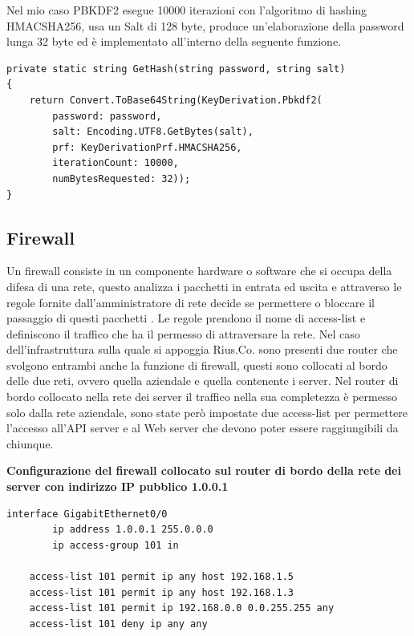 \medskip
Nel mio caso PBKDF2 esegue 10000 iterazioni con l'algoritmo di hashing HMACSHA256, usa un Salt di 128 byte, produce un'elaborazione della password lunga 32 byte ed è implementato all'interno della seguente funzione. 
\smallskip

\begin{lstlisting}[style=csharp]
private static string GetHash(string password, string salt)
{
    return Convert.ToBase64String(KeyDerivation.Pbkdf2(
        password: password,
        salt: Encoding.UTF8.GetBytes(salt),
        prf: KeyDerivationPrf.HMACSHA256,
        iterationCount: 10000,
        numBytesRequested: 32));
}
\end{lstlisting}
\subsection{Firewall}
Un firewall consiste in un componente hardware o software che si occupa della difesa di una rete, questo analizza i pacchetti in entrata ed uscita e attraverso le regole fornite dall'amministratore di rete decide se permettere o bloccare il passaggio di questi pacchetti \cite{Firewall}. Le regole prendono il nome di access-list e definiscono il traffico che ha il permesso di attraversare la rete. Nel caso dell'infrastruttura sulla quale si appoggia Rius.Co. sono presenti due router che svolgono entrambi anche la funzione di firewall, questi sono collocati al bordo delle due reti, ovvero quella aziendale e quella contenente i server. Nel router di bordo collocato nella rete dei server il traffico nella sua completezza è permesso solo dalla rete aziendale, sono state però impostate due access-list per permettere l'accesso all'API server e al Web server che devono poter essere raggiungibili da chiunque. 
\bigskip

\textbf{Configurazione del firewall collocato sul router di bordo della rete dei server con indirizzo IP pubblico 1.0.0.1}
\begin{lstlisting}[style=dos]
    interface GigabitEthernet0/0
        ip address 1.0.0.1 255.0.0.0
        ip access-group 101 in
        
    access-list 101 permit ip any host 192.168.1.5
    access-list 101 permit ip any host 192.168.1.3
    access-list 101 permit ip 192.168.0.0 0.0.255.255 any
    access-list 101 deny ip any any
\end{lstlisting}
